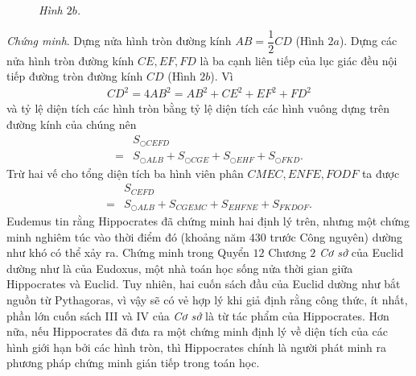 \begin{multicols}{2}
\begin{figure}[H]
		\caption{\small\textit{\color{lichsutoanhoc}Hình $2b$.}}
		\vspace*{-5pt}
	\end{figure}
	\textit{Chứng minh}. Dựng nửa hình tròn đường kính $AB = \dfrac{1}{2}CD$ (Hình $2a$). Dựng các nửa hình tròn đường kính $CE, EF, FD$ là ba cạnh liên tiếp của lục giác đều nội tiếp đường tròn đường kính  $CD$ (Hình $2b$). Vì 
	\begin{align*}
		C{D^2} = 4A{B^2} = A{B^2} + C{E^2} + E{F^2} + F{D^2}
	\end{align*}
	và tỷ lệ diện tích các hình tròn bằng tỷ lệ diện tích các hình vuông dựng trên đường kính của chúng nên 
	\begin{align*}
		&{S_{\bigcirc CEFD}} \\
		= &{S_{\bigcirc ALB}} + {S_{\bigcirc CGE}} + {S_{\bigcirc EHF}} + {S_{\bigcirc FKD}}.
	\end{align*}
	Trừ hai vế cho tổng diện tích ba hình viên phân $CMEC, ENFE, FODF$  ta được  
	\begin{align*}
		&{S_{CEFD}} \\
		= &{S_{\bigcirc ALB}} + {S_{CGEMC}} + {S_{EHFNE}} + {S_{FKDOF}}.
	\end{align*}
	Eudemus tin rằng Hippocrates đã chứng minh hai định lý trên, nhưng một chứng minh nghiêm túc vào thời điểm đó (khoảng năm $430$ trước Công nguyên) dường như khó có thể xảy ra. Chứng minh trong Quyển $12$ Chương $2$ \textit{Cơ sở} của Euclid dường như là của Eudoxus, một nhà toán học sống nửa thời gian giữa Hippocrates và Euclid. Tuy nhiên, hai cuốn sách đầu của Euclid dường như bắt nguồn từ Pythagoras, vì vậy sẽ có vẻ hợp lý khi giả định rằng công thức, ít nhất, phần lớn cuốn sách III và IV của \textit{Cơ sở}  là từ tác phẩm của Hippocrates. Hơn nữa, nếu Hippocrates đã đưa ra một chứng minh định lý về diện tích của các hình giới hạn bởi các hình tròn, thì Hippocrates chính là người phát minh ra phương pháp chứng minh gián tiếp trong toán học. 

\end{multicols}
